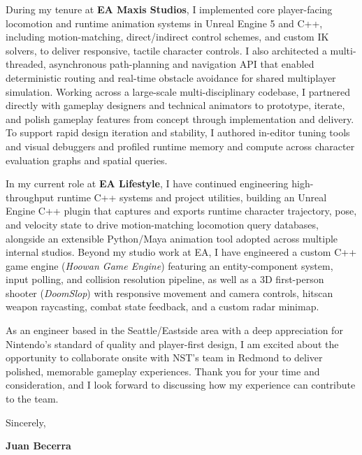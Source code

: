 \documentclass[letterpaper,11pt]{article}
\begin{document}
During my tenure at \textbf{EA Maxis Studios}, I implemented core player-facing locomotion and 
runtime animation systems in Unreal Engine 5 and C++, including motion-matching, direct/indirect 
control schemes, and custom IK solvers, to deliver responsive, tactile character controls. 
I also architected a multi-threaded, asynchronous path-planning and navigation API that enabled 
deterministic routing and real-time obstacle avoidance for shared multiplayer simulation. 
Working across a large-scale multi-disciplinary codebase, I partnered directly with gameplay 
designers and technical animators to prototype, iterate, and polish gameplay features from 
concept through implementation and delivery. To support rapid design iteration and stability, 
I authored in-editor tuning tools and visual debuggers and profiled runtime memory and compute 
across character evaluation graphs and spatial queries.

In my current role at \textbf{EA Lifestyle}, I have continued engineering high-throughput runtime 
C++ systems and project utilities, building an Unreal Engine C++ plugin that captures and exports 
runtime character trajectory, pose, and velocity state to drive motion-matching locomotion query 
databases, alongside an extensible Python/Maya animation tool adopted across multiple internal 
studios. Beyond my studio work at EA, I have engineered a custom C++ game engine (\emph{Hoowan 
Game Engine}) featuring an entity-component system, input polling, and collision resolution 
pipeline, as well as a 3D first-person shooter (\emph{DoomSlop}) with responsive movement and 
camera controls, hitscan weapon raycasting, combat state feedback, and a custom radar minimap.

As an engineer based in the Seattle/Eastside area with a deep appreciation for Nintendo's standard 
of quality and player-first design, I am excited about the opportunity to collaborate onsite with 
NST's team in Redmond to deliver polished, memorable gameplay experiences. Thank you for your time 
and consideration, and I look forward to discussing how my experience can contribute to the team.

\vspace{10pt}
\noindent Sincerely,

\vspace{14pt}
\noindent \textbf{Juan Becerra}
\end{document}
